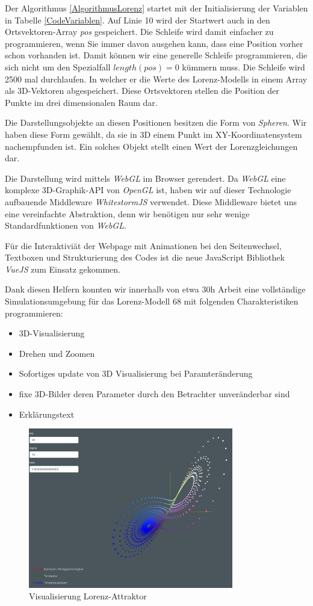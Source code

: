 Der Algorithmus \ref{AlgorithmusLorenz} startet mit der Initialisierung der Variablen in Tabelle \ref{CodeVariablen}. Auf Linie 10 wird der Startwert auch in den Ortsvektoren-Array \textit{pos} gespeichert. Die Schleife wird damit einfacher zu programmieren, wenn Sie immer davon ausgehen kann, dass eine Position vorher schon vorhanden ist. Damit können wir eine generelle Schleife programmieren, die sich nicht um den Spezialfall $ length(pos) = 0 $ kümmern muss.
Die Schleife wird 2500 mal durchlaufen. In welcher er die Werte des Lorenz-Modells in einem Array als 3D-Vektoren abgespeichert. Diese Ortsvektoren stellen die Position der Punkte im drei dimensionalen Raum dar.

Die Darstellungsobjekte an diesen Positionen besitzen die Form von \textit{Spheren}. Wir haben diese Form gewählt, da sie in 3D einem Punkt im XY-Koordinatensystem nachempfunden ist. Ein solches Objekt stellt einen Wert der Lorenzgleichungen dar.

Die Darstellung wird mittels \textit{WebGL}\cite{WebGL} im Browser gerendert. Da \textit{WebGL} eine komplexe 3D-Graphik-API von \textit{OpenGL} ist, haben wir auf dieser Technologie aufbauende Middleware \textit{WhitestormJS}\cite{whitestormJS} verwendet. Diese Middleware bietet uns eine vereinfachte Abstraktion, denn wir benötigen nur sehr wenige Standardfunktionen von \textit{WebGL}.

Für die Interaktiviät der Webpage mit Animationen bei den Seitenwechsel, Textboxen und Strukturierung des Codes ist die neue JavaScript Bibliothek \textit{VueJS}\cite{VueJS} zum Einsatz gekommen.

Dank diesen Helfern konnten wir innerhalb von etwa 30h Arbeit eine vollständige Simulationsumgebung für das Lorenz-Modell 68 mit folgenden Charakteristiken programmieren:

\begin{itemize}
	\item 3D-Visualisierung
	\item Drehen und Zoomen
	\item Sofortiges update von 3D Visualisierung bei Paramteränderung
	\item fixe 3D-Bilder deren Parameter durch den Betrachter unveränderbar sind
	\item Erklärungstext
\end{itemize}

\begin{figure}
	\centering	\includegraphics[height=7cm]{lorenz/assets/implementation/Visualisierung}
	\caption{Visualisierung Lorenz-Attraktor}
	\label{fig:visualisierung}
\end{figure}
